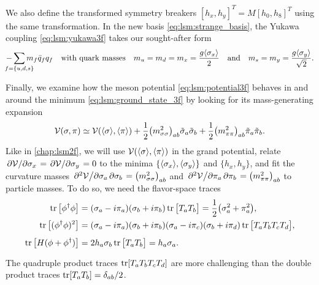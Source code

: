 We also define the transformed symmetry breakers 
$[h_x,h_y]^T = M [h_0,h_8]^T$
using the same transformation.
In the new basis \eqref{eq:lsm:strange_basis}, the Yukawa coupling \eqref{eq:lsm:yukawa3f} takes our sought-after form
\begin{equation}
	- \smashoperator{\sum_{f=\{u,d,s\}}} m_f \bar{q}_f q_f
	\quad \text{with quark masses} \quad
	m_u = m_d = m_x = \frac{g \avg{\sigma_x}}{2}
	\quad \text{and} \quad
	m_s = m_y = \frac{g \avg{\sigma_y}}{\sqrt{2}}.
\label{eq:lsm:quark_masses_3f}
\end{equation}

Finally, we examine how the meson potential \eqref{eq:lsm:potential3f} behaves in and around the minimum \eqref{eq:lsm:ground_state_3f}
by looking for its mass-generating expansion
\begin{equation}
	\mathcal{V}(\sigma,\pi) \simeq \mathcal{V}(\langle \sigma \rangle,\langle \pi \rangle) + \frac12 \big(m^2_{\sigma\sigma}\big)_{ab} \tilde{\sigma}_a \tilde{\sigma}_b + \frac12 \big(m^2_{\pi\pi}\big)_{ab} \tilde{\pi}_a \tilde{\pi}_b.
\label{eq:lsm3f:potential_before_diagonalization}
\end{equation}
Like in \cref{chap:lsm2f},
we will use $\mathcal{V}(\langle \sigma \rangle,\langle \pi \rangle)$ in the grand potential,
relate $\pdv{\mathcal{V}}/{\sigma_{x}}=\pdv{\mathcal{V}}/{\sigma_{y}}=0$
to the minima $\{\langle \sigma_x \rangle,\langle \sigma_y \rangle\}$ and $\{h_x,h_y\}$,
and fit the curvature masses
$\pdv{\mathcal{V}}/{\sigma_a, \sigma_b} = \smash{\big(m^2_{\sigma\sigma}\big)_{ab}}$
and
$\pdv{\mathcal{V}}/{\pi_a, \pi_b} = \smash{\big(m^2_{\pi\pi}\big)_{ab}}$
to particle masses.
To do so, we need the flavor-space traces
\begin{subequations}
\begin{align}
	\operatorname{tr}\big[\phi^\dagger \phi\big]     &= (\sigma_a - i \pi_a) (\sigma_b + i \pi_b) \operatorname{tr} \big[ T_a T_b \big] = \frac12 \big(\sigma_a^2+\pi_a^2\big) , \\
	\operatorname{tr}\big[(\phi^\dagger \phi)^2\big] &= (\sigma_a - i \pi_a) (\sigma_b + i \pi_b) (\sigma_a - i \pi_c) (\sigma_b + i \pi_d) \operatorname{tr} \big[ T_a T_b T_c T_d \big], \\
	\operatorname{tr}\big[H(\phi+\phi^\dagger)\big]  &= 2 h_a \sigma_b \operatorname{tr} \big[ T_a T_b \big] = \vphantom{\frac12} h_a \sigma_a . \label{eq:lsm3f:traces_hphi}
\end{align}%
\label{eq:lsm3f:traces}%
\end{subequations}%
The quadruple product traces $\operatorname{tr}[T_a T_b T_c T_d]$ are more challenging than the double product traces $\operatorname{tr}[T_a T_b] = \delta_{ab}/2$.
